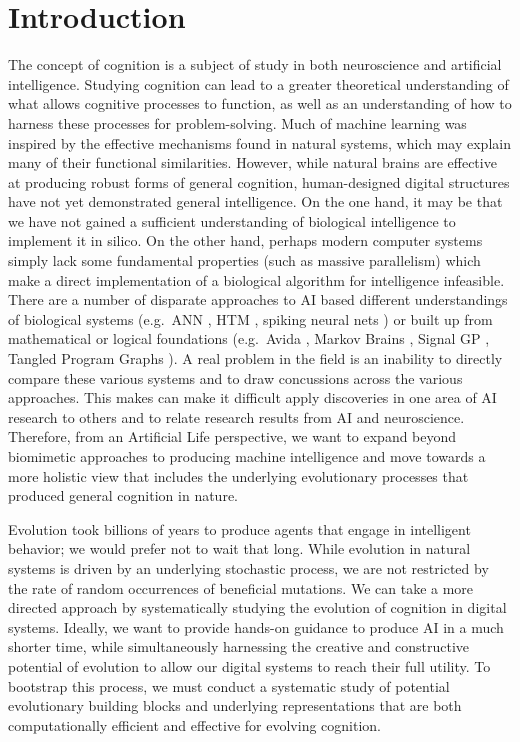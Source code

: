 \section{Introduction}

The concept of cognition is a subject of study in both neuroscience and artificial intelligence.
Studying cognition can lead to a greater theoretical understanding of what allows cognitive processes to function, as well as an understanding of how to harness these processes for problem-solving.
Much of machine learning was inspired by the effective mechanisms found in natural systems, which may explain many of their functional similarities.
However, while natural brains are effective at producing robust forms of general cognition, human-designed digital structures have not yet demonstrated general intelligence. 
On the one hand, it may be that we have not gained a sufficient understanding of biological intelligence to implement it in silico. 
On the other hand, perhaps modern computer systems simply lack some fundamental properties (such as massive parallelism) which make a direct implementation of a biological algorithm for intelligence infeasible. 
There are a number of disparate approaches to AI based different understandings of biological systems (e.g.~ANN \citep{rosenblatt_perceptron_1958}, HTM \citep{hawkins_hierarchical_2011}, spiking neural nets \citep{ghosh-dastidar_spiking_2009}) or built up from mathematical or logical foundations (e.g.~Avida \citep{ofria_avida_2004}, Markov Brains \citep{hintze_markov_2017}, Signal GP \citep{lalejini_evolving_2018}, Tangled Program Graphs \citep{kelly_multi-task_2017}). 
A real problem in the field is an inability to directly compare these various systems and to draw concussions across the various approaches. 
This makes can make it difficult apply discoveries in one area of AI research to others and to relate research results from AI and neuroscience.
Therefore, from an Artificial Life perspective, we want to expand beyond biomimetic approaches to producing machine intelligence and move towards a more holistic view that includes the underlying evolutionary processes that produced general cognition in nature.

Evolution took billions of years to produce agents that engage in intelligent behavior; we would prefer not to wait that long.
While evolution in natural systems is driven by an underlying stochastic process, we are not restricted by the rate of random occurrences of beneficial mutations. 
We can take a more directed approach by systematically studying the evolution of cognition in digital systems. 
Ideally, we want to provide hands-on guidance to produce AI in a much shorter time, while simultaneously harnessing the creative and constructive potential of evolution to allow our digital systems to reach their full utility.  
To bootstrap this process, we must conduct a systematic study of potential evolutionary building blocks and underlying representations that are both computationally efficient and effective for evolving cognition.

